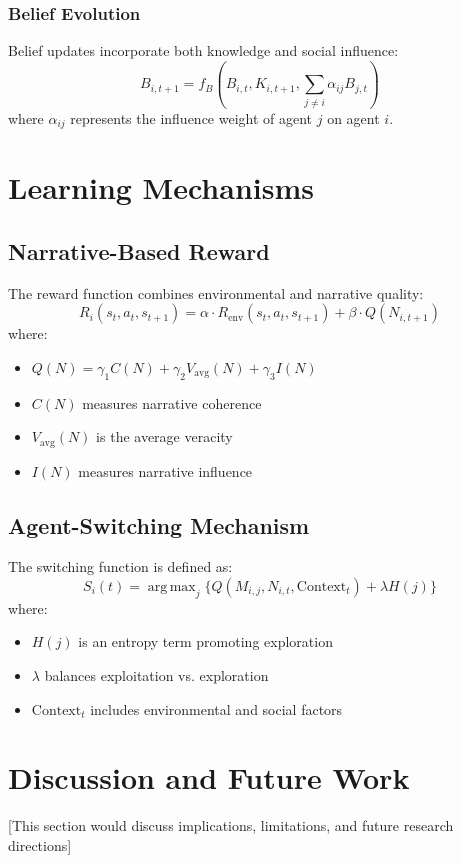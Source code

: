 \documentclass[12pt, a4paper]{article}
\DeclareMathOperator*{\argmax}{arg\,max}
\begin{document}
\subsubsection{Belief Evolution}
Belief updates incorporate both knowledge and social influence:
\begin{equation}
    B_{i,t+1} = f_B(B_{i,t}, K_{i,t+1}, \sum_{j \neq i} \alpha_{ij} B_{j,t})
\end{equation}
where $\alpha_{ij}$ represents the influence weight of agent $j$ on agent $i$.

\section{Learning Mechanisms}

\subsection{Narrative-Based Reward}
The reward function combines environmental and narrative quality:
\begin{equation}
    R_i(s_t, a_t, s_{t+1}) = \alpha \cdot R_{\text{env}}(s_t, a_t, s_{t+1}) + \beta \cdot Q(N_{i,t+1})
\end{equation}
where:
\begin{itemize}
    \item $Q(N) = \gamma_1 C(N) + \gamma_2 V_{\text{avg}}(N) + \gamma_3 I(N)$
    \item $C(N)$ measures narrative coherence
    \item $V_{\text{avg}}(N)$ is the average veracity
    \item $I(N)$ measures narrative influence
\end{itemize}

\subsection{Agent-Switching Mechanism}
The switching function is defined as:
\begin{equation}
    S_i(t) = \argmax_{j} \{Q(M_{i,j}, N_{i,t}, \text{Context}_t) + \lambda H(j)\}
\end{equation}
where:
\begin{itemize}
    \item $H(j)$ is an entropy term promoting exploration
    \item $\lambda$ balances exploitation vs. exploration
    \item $\text{Context}_t$ includes environmental and social factors
\end{itemize}

\section{Discussion and Future Work}
[This section would discuss implications, limitations, and future research directions]
\end{document}
